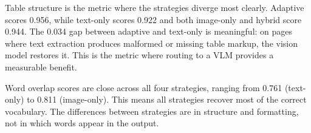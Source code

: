 Table structure is the metric where the strategies diverge most clearly.
Adaptive scores 0.956, while text-only scores 0.922 and both image-only
and hybrid score 0.944. The 0.034 gap between adaptive and text-only is
meaningful: on pages where text extraction produces malformed or missing
table markup, the vision model restores it. This is the metric where
routing to a VLM provides a measurable benefit.

Word overlap scores are close across all four strategies, ranging from
0.761 (text-only) to 0.811 (image-only). This means all strategies
recover most of the correct vocabulary. The differences between strategies
are in structure and formatting, not in which words appear in the output.
